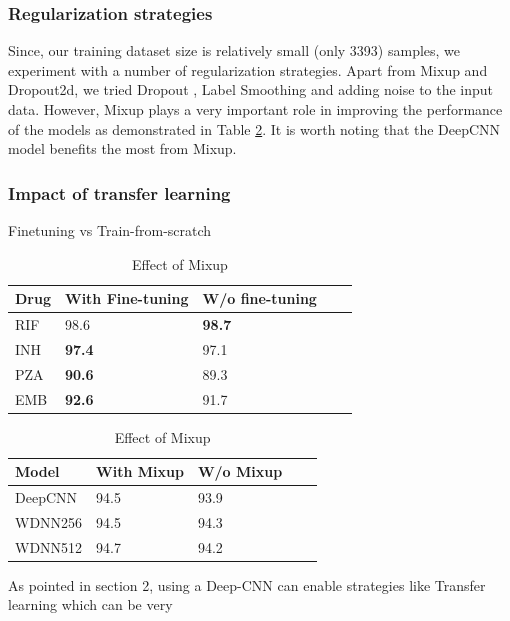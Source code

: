 \documentclass{article}
\begin{document}
\subsubsection{Regularization strategies}
Since, our training dataset size is relatively small (only 3393) samples, we experiment with a number of
regularization strategies. Apart from Mixup and Dropout2d, we tried Dropout \cite{JMLR:v15:srivastava14a}, Label Smoothing \cite{pereyra2017regularizing} and adding noise
to the input data. However, Mixup plays a very important role in improving the performance of the models
as demonstrated in Table \ref{table:mixup}. It is worth noting that the DeepCNN model benefits the
most from Mixup.

\subsubsection{Impact of transfer learning}
\begin{table}[t]
  \begin{minipage}{0.5\linewidth}
  \centering
  \caption{Finetuning vs Train-from-scratch}
  \begin{tabular}{lllll}
      \toprule
      \multirow{1}{*}[0em]{Drug} & With Fine-tuning & W/o fine-tuning\\
      \midrule
      RIF & 98.6 & \textbf{98.7} \\
      INH & \textbf{97.4} & 97.1 \\
      PZA & \textbf{90.6} & 89.3 \\
      EMB & \textbf{92.6} & 91.7 \\
      \bottomrule
  \end{tabular}
  \label{table:finetune}
\end{minipage}
\begin{minipage}{0.5\linewidth}
  \centering
  \caption{Effect of Mixup}
  \begin{tabular}{lllll}
      \toprule
      \multirow{1}{*}[0em]{Model} & With Mixup & W/o Mixup\\
      \midrule
      DeepCNN & 94.5 & 93.9 \\
      WDNN256 & 94.5 & 94.3 \\
      WDNN512 & 94.7 & 94.2 \\
      \bottomrule
  \end{tabular}
  \label{table:mixup}
\end{minipage}
\end{table}
As pointed in section 2, using a Deep-CNN can enable strategies like Transfer learning which can be very
\end{document}
